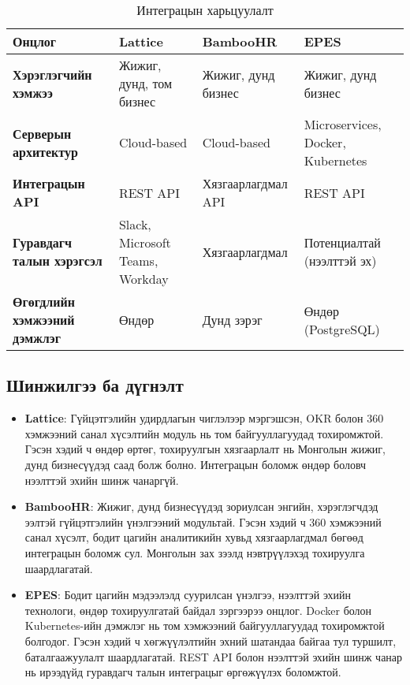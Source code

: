 \begin{table}[H]
\centering
\small
\begin{tabular}{|>{\raggedright\arraybackslash}p{3.5cm}|>{\raggedright\arraybackslash}p{4cm}|>{\raggedright\arraybackslash}p{4cm}|>{\raggedright\arraybackslash}p{4cm}|}
\hline
\textbf{Онцлог} & \textbf{Lattice} & \textbf{BambooHR} & \textbf{EPES} \\
\hline
\textbf{Хэрэглэгчийн хэмжээ} & Жижиг, дунд, том бизнес & Жижиг, дунд бизнес & Жижиг, дунд бизнес \\
\hline
\textbf{Серверын архитектур} & Cloud-based & Cloud-based & Microservices, Docker, Kubernetes \\
\hline
\textbf{Интеграцын API} & REST API & Хязгаарлагдмал API & REST API \\
\hline
\textbf{Гуравдагч талын хэрэгсэл} & Slack, Microsoft Teams, Workday & Хязгаарлагдмал & Потенциалтай (нээлттэй эх) \\
\hline
\textbf{Өгөгдлийн хэмжээний дэмжлэг} & Өндөр & Дунд зэрэг & Өндөр (PostgreSQL) \\
\hline
\end{tabular}
\caption{Интеграцын харьцуулалт}
\label{tab:scalability_integration}
\end{table}

\subsection{Шинжилгээ ба дүгнэлт}
\begin{itemize}
    \item \textbf{Lattice}: Гүйцэтгэлийн удирдлагын чиглэлээр мэргэшсэн, OKR болон 360 хэмжээний санал хүсэлтийн модуль 
    нь том байгууллагуудад тохиромжтой. Гэсэн хэдий ч өндөр өртөг, тохируулгын хязгаарлалт нь Монголын жижиг, дунд бизнесүүдэд 
    саад болж болно. Интеграцын боломж өндөр боловч нээлттэй эхийн шинж чанаргүй.
    \item \textbf{BambooHR}: Жижиг, дунд бизнесүүдэд зориулсан энгийн, хэрэглэгчдэд ээлтэй гүйцэтгэлийн үнэлгээний модультай. 
    Гэсэн хэдий ч 360 хэмжээний санал хүсэлт, бодит цагийн аналитикийн хувьд хязгаарлагдмал бөгөөд интеграцын боломж сул. 
    Монголын зах зээлд нэвтрүүлэхэд тохируулга шаардлагатай.
    \item \textbf{EPES}: Бодит цагийн мэдээлэлд суурилсан үнэлгээ, нээлттэй эхийн технологи, өндөр тохируулгатай байдал зэргээрээ онцлог. 
    Docker болон Kubernetes-ийн дэмжлэг нь том хэмжээний байгууллагуудад тохиромжтой болгодог. Гэсэн хэдий ч хөгжүүлэлтийн эхний шатандаа 
    байгаа тул туршилт, баталгаажуулалт шаардлагатай. REST API болон нээлттэй эхийн шинж чанар нь ирээдүйд гуравдагч талын интеграцыг 
    өргөжүүлэх боломжтой.
\end{itemize}

